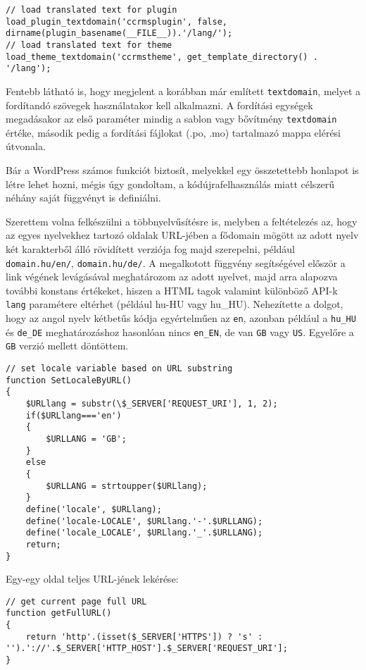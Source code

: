 \begin{lstlisting}
// load translated text for plugin
load_plugin_textdomain('ccrmsplugin', false, dirname(plugin_basename(__FILE__)).'/lang/');
// load translated text for theme
load_theme_textdomain('ccrmstheme', get_template_directory() . '/lang');
\end{lstlisting}

Fentebb látható is, hogy megjelent a korábban már említett \verb|textdomain|, melyet a fordítandó szövegek használatakor kell alkalmazni. A fordítási egységek megadásakor az első paraméter mindig a sablon vagy bővítmény \verb|textdomain| értéke, második pedig a fordítási fájlokat (.po, .mo) tartalmazó mappa elérési útvonala.


Bár a WordPress számos funkciót biztosít, melyekkel egy összetettebb honlapot is létre lehet hozni, mégis úgy gondoltam, a kódújrafelhasználás miatt célszerű néhány saját függvényt is definiálni.

Szerettem volna felkészülni a többnyelvűsítésre is, melyben a feltételezés az, hogy az egyes nyelvekhez tartozó oldalak URL-jében a fődomain mögött az adott nyelv két karakterből álló rövidített verziója fog majd szerepelni, például \texttt{domain.hu/en/}, \texttt{domain.hu/de/}. A megalkotott függvény segítségével először a link végének levágásával meghatározom az adott nyelvet, majd arra alapozva további konstans értékeket, hiszen a HTML tagok valamint különböző API-k \verb|lang| paramétere eltérhet (például hu-HU vagy hu\_HU). Nehezítette a dolgot, hogy az angol nyelv kétbetűs kódja egyértelműen az \texttt{en}, azonban például a \texttt{hu\_HU} és \texttt{de\_DE} meghatározáshoz hasonlóan nincs \texttt{en\_EN}, de van \texttt{GB} vagy \texttt{US}. Egyelőre a \texttt{GB} verzió mellett döntöttem.

\newpage

\begin{lstlisting}
// set locale variable based on URL substring
function SetLocaleByURL()
{
	$URLlang = substr(\$_SERVER['REQUEST_URI'], 1, 2);
	if($URLlang==='en')
	{
		$URLLANG = 'GB';
	}
	else
	{
		$URLLANG = strtoupper($URLlang);
	}
	define('locale', $URLlang);
	define('locale-LOCALE', $URLlang.'-'.$URLLANG);
	define('locale_LOCALE', $URLlang.'_'.$URLLANG);
	return;
}
\end{lstlisting}

Egy-egy oldal teljes URL-jének lekérése:

\begin{lstlisting}
// get current page full URL
function getFullURL()
{
	return 'http'.(isset($_SERVER['HTTPS']) ? 's' : '').'://'.$_SERVER['HTTP_HOST'].$_SERVER['REQUEST_URI'];
}
\end{lstlisting}

